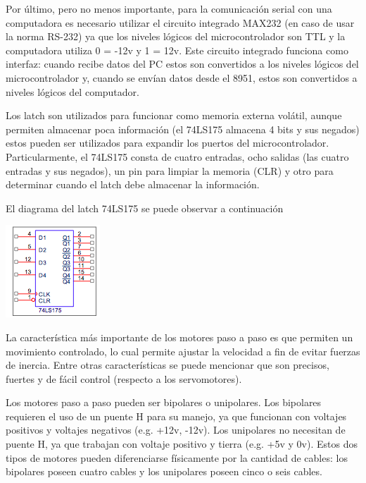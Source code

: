 	 Por último, pero no menos importante, para la comunicación serial con una 
	computadora es necesario utilizar el circuito integrado MAX232 (en caso de usar la 
	norma RS-232) ya que los niveles lógicos del microcontrolador son TTL y la 
	computadora utiliza 0 = -12v y 1 = 12v. Este circuito integrado funciona como 
	interfaz: cuando recibe datos del PC estos son convertidos a los niveles lógicos del 
	microcontrolador y, cuando se envían datos desde el 8951, estos son convertidos a 
	niveles lógicos del computador.  

	 Los latch son utilizados para funcionar como memoria externa volátil, aunque 
	permiten almacenar poca información (el 74LS175 almacena 4 bits y sus negados) 
	estos pueden ser utilizados para expandir los puertos del microcontrolador. 
	Particularmente, el 74LS175 consta de cuatro entradas, ocho salidas (las cuatro 
	entradas y sus negados), un pin para limpiar la memoria (CLR) y otro para determinar 
	cuando el latch debe almacenar la información. 
	
	 El diagrama del latch 74LS175 se puede observar a continuación 
	
	\begin{ilustracion}
		\includegraphics{figures/figura-7.png}
	\end{ilustracion}
	
	 La característica más importante de los motores paso a paso es que permiten 
	un movimiento controlado, lo cual permite ajustar la velocidad a fin de evitar fuerzas 
	de inercia. Entre otras características se puede mencionar que son precisos, fuertes y 
	de fácil control (respecto a los servomotores). 
	
	 Los motores paso a paso pueden ser bipolares o unipolares. Los bipolares 
	requieren el uso de un puente H para su manejo, ya que funcionan con voltajes 
	positivos y voltajes negativos (e.g. +12v, -12v). Los unipolares no necesitan de 
	puente H, ya que trabajan con voltaje positivo y tierra (e.g. +5v y 0v). Estos dos tipos 
	de motores pueden diferenciarse físicamente por la cantidad de cables: los bipolares 
	poseen cuatro cables y los unipolares poseen cinco o seis cables. 
	
